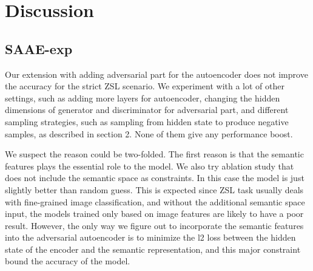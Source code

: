 \documentclass{article}
\begin{document}

\section{Discussion}







\subsection{SAAE-exp}
Our extension with adding adversarial part for the autoencoder does not improve the accuracy for the strict ZSL scenario. We experiment with a lot of other settings, such as adding more layers for autoencoder, changing the hidden dimensions of generator and discriminator for adversarial part, and different sampling strategies, such as sampling from hidden state to produce negative samples, as described in \cite{makhzani2015adversarial} section 2. None of them give any performance boost. 

We suspect the reason could be two-folded. The first reason is that the semantic features plays the essential role to the model. We also try ablation study that does not include the semantic space as constraints. In this case the model is just slightly better than random guess. This is expected since ZSL task usually deals with fine-grained image classification, and without the additional semantic space input, the models trained only based on image features are likely to have a poor result. However, the only way we figure out to incorporate the semantic features into the adversarial autoencoder is to minimize the l2 loss between the hidden state of the encoder and the semantic representation, and this major constraint bound the accuracy of the model. 
\end{document}
